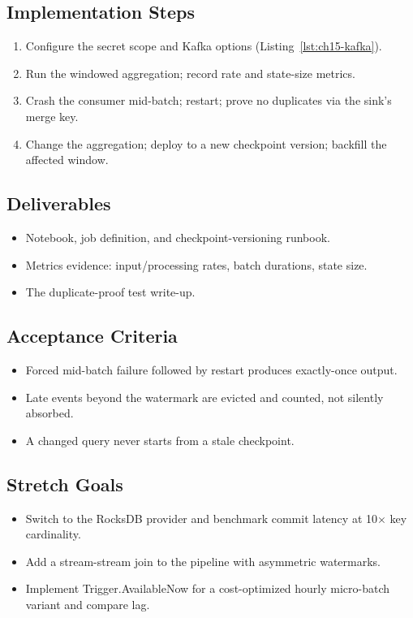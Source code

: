 \subsection*{Implementation Steps}
\begin{enumerate}
    \item Configure the secret scope and Kafka options (Listing~\ref{lst:ch15-kafka}).
    \item Run the windowed aggregation; record rate and state-size metrics.
    \item Crash the consumer mid-batch; restart; prove no duplicates via the sink's merge key.
    \item Change the aggregation; deploy to a new checkpoint version; backfill the affected window.
\end{enumerate}

\subsection*{Deliverables}
\begin{itemize}
    \item Notebook, job definition, and checkpoint-versioning runbook.
    \item Metrics evidence: input/processing rates, batch durations, state size.
    \item The duplicate-proof test write-up.
\end{itemize}

\subsection*{Acceptance Criteria}
\begin{itemize}
    \item Forced mid-batch failure followed by restart produces exactly-once output.
    \item Late events beyond the watermark are evicted and counted, not silently absorbed.
    \item A changed query never starts from a stale checkpoint.
\end{itemize}

\subsection*{Stretch Goals}
\begin{itemize}
    \item Switch to the RocksDB provider and benchmark commit latency at 10$\times$ key cardinality.
    \item Add a stream-stream join to the pipeline with asymmetric watermarks.
    \item Implement Trigger.AvailableNow for a cost-optimized hourly micro-batch variant and compare lag.
\end{itemize}
